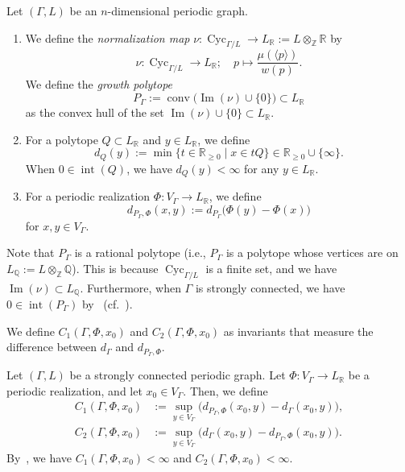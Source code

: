 \documentclass[11pt]{article}
\theoremstyle{definition}
\numberwithin{equation}{section}
\begin{document}
\begin{defn}\label{defi:P}
Let $(\Gamma , L)$ be an $n$-dimensional periodic graph. 
\begin{enumerate}
\item 
We define the \textit{normalization map} 
$\nu : \operatorname{Cyc}_{\Gamma /L} \to L_{\mathbb{R}} := L \otimes _{\mathbb{Z}} \mathbb{R}$ by 
\[
\nu: \operatorname{Cyc}_{\Gamma /L} \to L_{\mathbb{R}}; \quad p \mapsto \frac{\mu(\langle p \rangle )}{w(p)}. 
\]
We define the \textit{growth polytope}
\[
P_{\Gamma} := \operatorname{conv} \bigl( \operatorname{Im}(\nu) \cup \{ 0 \} \bigr) \subset L_{\mathbb{R}}
\]
as the convex hull of the set 
$\operatorname{Im}(\nu) \cup \{ 0 \} \subset L_{\mathbb{R}}$. 
 
\item 
For a polytope $Q \subset L_{\mathbb{R}}$ and $y \in L_{\mathbb{R}}$, we define 
\[
d_{Q}(y) := \min \{ t \in \mathbb{R}_{\ge 0} \mid x \in t Q \} \in \mathbb{R}_{\ge 0} \cup \{ \infty \}. 
\]
When $0 \in \operatorname{int}(Q)$, 
we have $d_{Q}(y) < \infty$ for any $y \in L_{\mathbb{R}}$. 

\item
For a periodic realization $\Phi:V_{\Gamma} \to L_{\mathbb{R}}$, we define 
\[
d_{P_{\Gamma}, \Phi}(x, y) := d_{P_{\Gamma}}\bigl( \Phi(y) - \Phi(x) \bigr)
\]
for $x, y \in V_{\Gamma}$. 
\end{enumerate}
\end{defn}

\begin{rmk}
Note that $P_{\Gamma}$ is a rational polytope (i.e., $P_{\Gamma}$ is a polytope whose vertices are on $L_{\mathbb{Q}} := L \otimes _{\mathbb{Z}} \mathbb{Q}$). 
This is because $\operatorname{Cyc}_{\Gamma /L}$ is a finite set, and we have $\operatorname{Im}(\nu) \subset L_{\mathbb{Q}}$. 
Furthermore, when $\Gamma$ is strongly connected, we have $0 \in \operatorname{int}(P_{\Gamma})$ by~\cite[Proposition~21]{Fri13} (cf.\ \cite[Lemma A.1]{IN}). 
\end{rmk}

We define $C_{1}(\Gamma, \Phi, x_0)$ and $C_{2}(\Gamma, \Phi, x_0)$ as invariants that measure the difference between $d_{\Gamma}$ and $d_{P_{\Gamma}, \Phi}$. 

\begin{defn}\label{defi:C}
Let $(\Gamma , L)$ be a strongly connected periodic graph. 
Let $\Phi : V_{\Gamma} \to L_{\mathbb{R}}$ be a periodic realization, and let $x_0 \in V_{\Gamma}$. 
Then, we define 
\begin{align*}
C_{1}(\Gamma, \Phi, x_0) &:= \sup _{y \in V_{\Gamma}} \bigl( d_{P_{\Gamma}, \Phi} (x_0, y) - d_{\Gamma} (x_0, y) \bigr), \\
C_{2}(\Gamma, \Phi, x_0) &:= \sup _{y \in V_{\Gamma}} \bigl( d_{\Gamma}(x_0, y) - d_{P_{\Gamma}, \Phi} ( x_0, y ) \bigr). 
\end{align*}
By~\cite[Theorem A.2]{IN}, we have $C_{1}(\Gamma, \Phi, x_0) < \infty$ and $C_{2}(\Gamma, \Phi, x_0) < \infty$. 
\end{defn}
\end{document}
